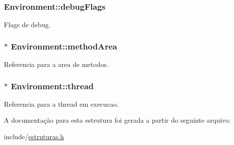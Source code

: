 \subsubsection[{\texorpdfstring{debug\+Flags}{debugFlags}}]{ Environment\+::debug\+Flags}\hypertarget{struct_environment_a8c0e2258ed60e94b0c7a66eac8e27e64}{}\label{struct_environment_a8c0e2258ed60e94b0c7a66eac8e27e64}


Flags de debug. 

\subsubsection[{\texorpdfstring{method\+Area}{methodArea}}]{$\ast$ Environment\+::method\+Area}\hypertarget{struct_environment_a1c73c41c6c38e7e67ea22f6d59044852}{}\label{struct_environment_a1c73c41c6c38e7e67ea22f6d59044852}


Referencia para a area de metodos. 

\subsubsection[{\texorpdfstring{thread}{thread}}]{$\ast$ Environment\+::thread}\hypertarget{struct_environment_a9521ae1091a45875768bdbbe0a339014}{}\label{struct_environment_a9521ae1091a45875768bdbbe0a339014}


Referencia para a thread em execucao. 



A documentação para esta estrutura foi gerada a partir do seguinte arquivo\+:\begin{DoxyCompactItemize}
\item 
include/\hyperlink{estruturas_8h}{estruturas.\+h}\end{DoxyCompactItemize}
